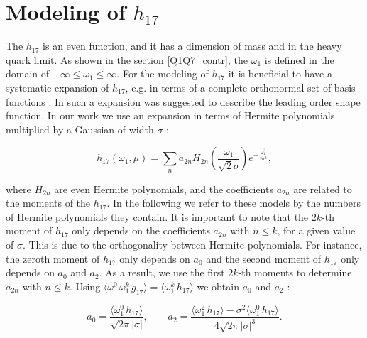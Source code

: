 \section{Modeling of $h_{17}$}\label{Model}

The $h_{17}$ is an even function, and it has a dimension of mass and in the heavy quark limit. As shown in the section \ref{Q1Q7_contr}, the $\omega_1$ is defined in the domain of $-\infty\leq\omega_1\leq \infty$. For the modeling of $h_{17}$ it is beneficial to have a systematic
expansion of $h_{17}$, e.g. in terms of a complete orthonormal set of basis functions \cite{Gunawardana:2019gep}. In \cite{Ligeti:2008ac} such a expansion was suggested to describe the leading order shape function. In our work we use an expansion in terms of Hermite polynomials multiplied by a Gaussian of width $\sigma$ \cite{Gunawardana:2019gep}:

\begin{equation}\label{h17General} 
h_{17}(\omega_1,\mu)=\sum_n a_{2n} H_{2n}\left(\frac{\omega_1}{\sqrt{2}\sigma}\right)e^{-\frac{\omega_1^2}{2\sigma^2}},
\end{equation}

where $H_{2n}$ are even Hermite polynomials, and the coefficients $a_{2n}$ are related to the moments of the $h_{17}$. In the following we refer to these models by the numbers of Hermite polynomials they contain. It is important to note that the  $2k$-th moment of $h_{17}$ only depends on the coefficients $a_{2n}$ with $n\leq k$, for a given value of $\sigma$. This is due to the orthogonality between Hermite polynomials. For instance, the zeroth moment of $h_{17}$ only depends on $a_0$ and the second moment of $h_{17}$ only depends on $a_0$ and $a_2$. As a result, we use the first $2k$-th moments to determine $a_{2n}$ with $n\leq k$. Using $\langle\omega^0\,\omega_1^k\,g_{17}\rangle=\langle\omega_1^k\,h_{17}\rangle$ we obtain  $a_0$ and $a_2$ \cite{Gunawardana:2019gep}:

\begin{equation}\label{a0a2}
a_0=\frac{\langle\omega_1^0\,h_{17}\rangle}{\sqrt{2\pi}|\sigma|}, \qquad a_2=\frac{\langle\omega_1^2\,h_{17}\rangle-\sigma^2\langle\omega_1^0\,h_{17}\rangle}{4\sqrt{2\pi}|\sigma|^3}.
\end{equation}


